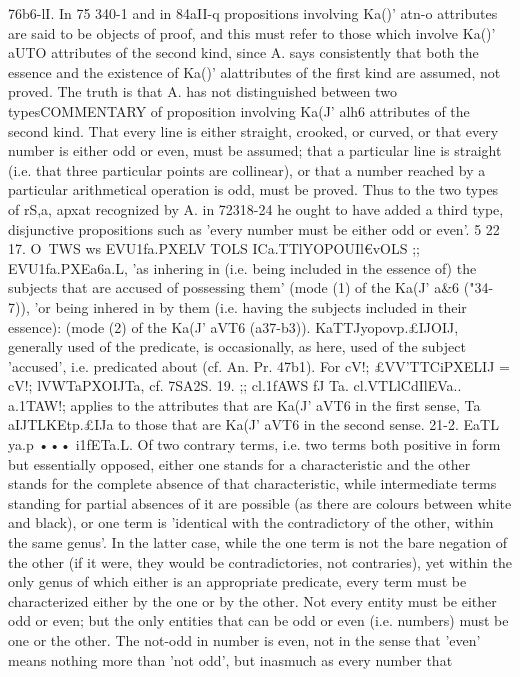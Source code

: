 {{{{{{76b6-lI. In 75 340-1 and in 84aII-q propositions involving Ka()'
atn-o attributes are said to be objects of proof, and this must refer
to those which involve Ka()' aUTO attributes of the second kind,
since A. says consistently that both the essence and the existence
of Ka()' al\TO attributes of the first kind are assumed, not proved.
The truth is that A. has not distinguished between two typesCOMMENTARY
of proposition involving Ka(J' alh6 attributes of the second kind.
That every line is either straight, crooked, or curved, or that
every number is either odd or even, must be assumed; that a
particular line is straight (i.e. that three particular points are
collinear), or that a number reached by a particular arithmetical
operation is odd, must be proved. Thus to the two types of
rS,a, apxat recognized by A. in 72318-24 he ought to have added
a third type, disjunctive propositions such as 'every number must
be either odd or even'.
5 22
17. O~TWS
ws EVU1fa.PXELV TOLS ICa.TTlYOPOUIl€vOLS ;; EVU1fa.PXEa6a.L,
'as inhering in (i.e. being included in the essence of) the subjects
that are accused of possessing them' (mode (1) of the Ka(J' a&6
("34-7)), 'or being inhered in by them (i.e. having the subjects
included in their essence): (mode (2) of the Ka(J' aVT6 (a37-b3)).
KaTTJyopovp.£IJOIJ, generally used of the predicate, is occasionally,
as here, used of the subject 'accused', i.e. predicated about (cf.
An. Pr. 47b1).
For cV!; £VV'TTCiPXELIJ = cV!; lVWTaPXOIJTa, cf. 7SA2S.
19. ;; cl.1fAWS fJ Ta. cl.VTLlCdIlEVa.. a.1TAW!; applies to the attributes
that are Ka(J' aVT6 in the first sense, Ta aIJTLKEtp.£IJa to those that
are Ka(J' aVT6 in the second sense.
21-2. EaTL ya.p ••• i1fETa.L. Of two contrary terms, i.e. two
terms both positive in form but essentially opposed, either one
stands for a characteristic and the other stands for the complete
absence of that characteristic, while intermediate terms standing
for partial absences of it are possible (as there are colours between
white and black), or one term is 'identical with the contradictory
of the other, within the same genus'. In the latter case, while
the one term is not the bare negation of the other (if it were,
they would be contradictories, not contraries), yet within the
only genus of which either is an appropriate predicate, every term
must be characterized either by the one or by the other. Not
every entity must be either odd or even; but the only entities
that can be odd or even (i.e. numbers) must be one or the other.
The not-odd in number is even, not in the sense that 'even' means
nothing more than 'not odd', but inasmuch as every number that
}}}}}}
